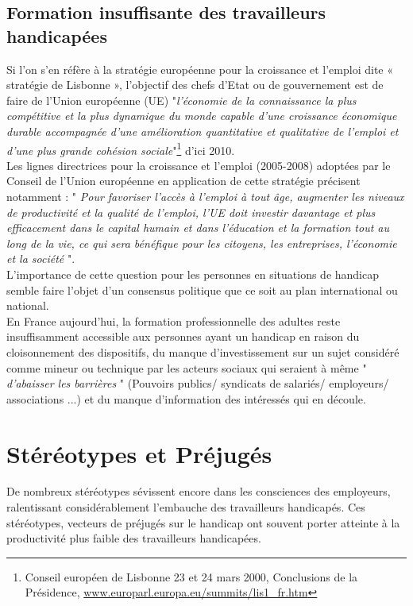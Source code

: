 \subsection{Formation insuffisante des travailleurs handicapées}
Si l'on s'en réfère à la stratégie européenne pour la croissance et l'emploi dite « stratégie de Lisbonne », l'objectif des chefs d'Etat ou de gouvernement est de faire de l'Union européenne (UE) "\textit{l'économie de la connaissance la plus compétitive et la plus dynamique du monde capable d'une croissance économique durable accompagnée d'une amélioration quantitative et qualitative de l'emploi et d'une plus grande cohésion sociale}"\footnote{Conseil européen de Lisbonne 23 et 24 mars 2000, Conclusions de la Présidence,
\url{www.europarl.europa.eu/summits/lis1_fr.htm}
} d'ici 2010.\\

Les lignes directrices pour la croissance et l'emploi (2005-2008) adoptées par le Conseil de l'Union européenne en application de cette stratégie précisent notamment : " \textit{Pour favoriser l'accès à l'emploi à tout âge, augmenter les niveaux de productivité et la qualité de l'emploi, l'UE doit investir davantage et plus efficacement dans le capital humain et dans l'éducation et la formation tout au long de la vie, ce qui sera bénéfique pour les citoyens, les entreprises, l'économie et la société} ".\\

L'importance de cette question pour les personnes en situations de handicap semble faire l'objet d'un consensus politique que ce soit au plan international ou national.\\

En France aujourd'hui, la formation professionnelle des adultes reste insuffisamment accessible aux personnes ayant un handicap en raison du cloisonnement des dispositifs, du manque d'investissement sur un sujet considéré comme mineur ou technique par les acteurs sociaux qui seraient à même " \textit{d'abaisser les barrières }" (Pouvoirs publics/ syndicats de salariés/ employeurs/ associations ...) et du manque d'information des intéressés qui en découle.~\cite{accesFormationTH}


\section{Stéréotypes et Préjugés}

De nombreux stéréotypes sévissent encore dans les consciences des employeurs, ralentissant considérablement l'embauche des travailleurs handicapés. Ces stéréotypes, vecteurs de préjugés sur le handicap ont souvent porter atteinte à la productivité plus faible des travailleurs handicapées.\\

